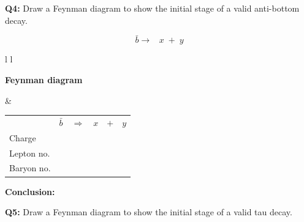 \documentclass[12pt]{article}
\begin{document}
\vspace{2.2cm}

\newpage
\textbf{Q4:} Draw a Feynman diagram to show the initial stage of a valid anti-bottom decay.

\vspace{0.4cm}
\[
\bar{b} \rightarrow \;\;\; x \;+\; y
\]

\vspace{0.5cm}

\begin{tabular}{l l}

\begin{minipage}[t]{0.46\textwidth}
\vspace{0pt}
\textbf{Feynman diagram}

\vspace{0.6cm}

\begin{tikzpicture}
  \path (0,0) rectangle (6,4.5);
\end{tikzpicture}

\end{minipage}
&
\begin{minipage}[t]{0.50\textwidth}
\vspace{0pt}

\renewcommand{\arraystretch}{1.4}
\begin{tabular}{@{}l c c c c c@{}}
 & \(\bar{b}\) & \(\Rightarrow\) & \(x\) & \(+\) & \(y\) \\
Charge &  &  &  &  &  \\
Lepton no. &  &  &  &  &  \\
Baryon no. &  &  &  &  &  \\
\end{tabular}

\end{minipage}

\end{tabular}

\vspace{0.5cm}

\textbf{Conclusion:}

\vspace{2.2cm}


\textbf{Q5:} Draw a Feynman diagram to show the initial stage of a valid tau decay.
\end{document}
